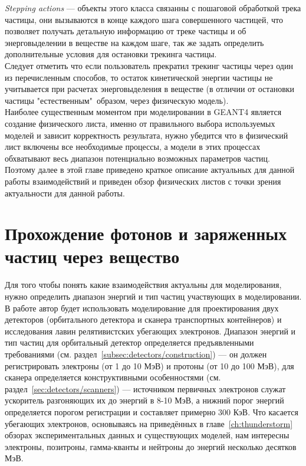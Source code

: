\textit{Stepping actions} --- объекты этого класса связанны с пошаговой обработкой трека частицы, они вызываются в конце каждого шага совершенного частицей, что позволяет  получать детальную информацию от треке частицы и об энерговыделении в веществе на каждом шаге, так же задать определить дополнительные условия для остановки трекинга частицы.\\
Следует отметить что если пользователь прекратил трекинг частицы через один из перечисленным способов, то остаток кинетической энергии частицы не учитывается при расчетах энерговыделения в веществе (в отличии от остановки частицы "естественным"~образом, через физическую модель).\\
Наиболее существенным моментом при моделировании в GEANT4 является создание физического листа, именно от правильного выбора используемых моделей и зависит корректность результата, нужно убедится что в физический лист включены
все необходимые процессы, а модели в этих процессах обхватывают весь диапазон потенциально возможных параметров частиц. Поэтому далее в этой главе  приведено краткое описание актуальных для данной работы взаимодействий и приведен обзор физических листов с точки зрения актуальности для данной работы.

\section{Прохождение фотонов и заряженных частиц через вещество}\label{sec:theory/propagation}
Для того чтобы понять какие взаимодействия актуальны для моделирования, нужно определить диапазон энергий и тип частиц участвующих в моделировании. В работе автор будет использовать моделирование для проектирования двух детекторов (орбитального детектора и сканера транспортных контейнеров) и исследования лавин релятивистских убегающих электронов. Диапазон энергий и тип частиц для  орбитальный детектор определяется предъявленными требованиями (см. раздел~\ref{subsec:detectors/construction}) --- он должен регистрировать электроны (от 1 до 10 МэВ) и протоны (от 10 до 100 МэВ), для сканера определяется конструктивными особенностями (см. раздел~\ref{sec:detectors/scanners}) --- источником первичных электронов служат ускоритель разгоняющих их до энергий в 8-10 МэВ, а нижний порог энергий определяется порогом регистрации и составляет примерно 300 КэВ. Что касается убегающих электронов, основываясь на приведённых в главе~\ref{ch:thunderstorm} обзорах экспериментальных данных и существующих моделей, нам интересны электроны, позитроны, гамма-кванты и нейтроны до энергий несколько десятков МэВ.

